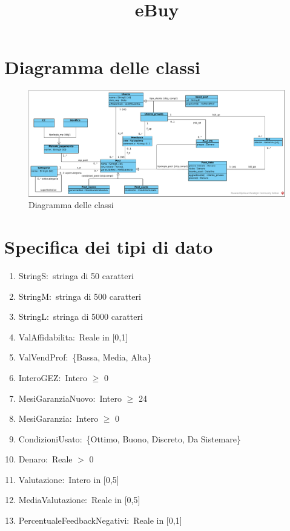 \documentclass{article}
\title{eBuy}
\author{}
\date{}
\begin{document}
\maketitle

\tableofcontents

\newpage

\section{\label{sec:DiagrammaDelleClassi}Diagramma delle classi}
\begin{figure}[h]
    \centering
    \includegraphics[width=1\textwidth]{../Diagrammi/diagramma delle classi.pdf}
    \caption{Diagramma delle classi}
\end{figure}

\newpage
\section{\label{Sec:SpecificaTipoDiDato}Specifica dei tipi di dato}

\begin{enumerate}
    \item\label{sec:TipoStringS}StringS$: $ stringa di 50 caratteri
    \item\label{sec:TipoStringM}StringM$: $ stringa di 500 caratteri
    \item\label{sec:TipoStringL}StringL$: $ stringa di 5000 caratteri
    \item\label{sec:TipoValAffidabilita}ValAffidabilita$: $ Reale in [0,1]
    \item\label{sec:TipoValVendProf}ValVendProf$: $ \{Bassa, Media, Alta\}
    \item\label{sec:TipoInteroGEZ}InteroGEZ$: $ Intero $\geq$ 0
    \item\label{sec:TipoMesiGaranziaNuovo}MesiGaranziaNuovo$: $ Intero $\geq$ 24
    \item\label{sec:TipoMesiGaranzia}MesiGaranzia$: $ Intero $\geq$ 0
    \item\label{sec:TipoCondizioniUsato}CondizioniUsato$: $ \{Ottimo, Buono, Discreto, Da Sistemare\}
    \item\label{sec:TipoDenaro}Denaro$: $ Reale $>$ 0
    \item\label{sec:TipoValutazione}Valutazione$: $ Intero in [0,5]
    \item\label{sec:TipoMediaValutazione}MediaValutazione$: $ Reale in [0,5]
    \item\label{sec:TipoPercentualeFeedbackNegativi}PercentualeFeedbackNegativi$: $ Reale in [0,1]
\end{enumerate}
\end{document}
